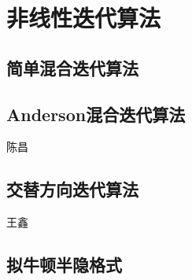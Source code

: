 \section{非线性迭代算法}

\subsection{简单混合迭代算法}

\subsection{Anderson混合迭代算法}
{\color{red}\begin{center}
    陈昌
\end{center}}

\subsection{交替方向迭代算法}
{\color{red}\begin{center}
    王鑫
\end{center}}

\subsection{拟牛顿半隐格式}
